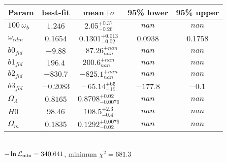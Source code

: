 \begin{tabular}{|l|c|c|c|c|} 
 \hline 
Param & best-fit & mean$\pm\sigma$ & 95\% lower & 95\% upper \\ \hline 
$100~\omega_{b }$ &$1.246$ & $2.05_{-0.26}^{+0.37}$ & $nan$ & $nan$ \\ 
$\omega_{cdm }$ &$0.1654$ & $0.1301_{-0.02}^{+0.013}$ & $0.0938$ & $0.1758$ \\ 
$b0_{fld }$ &$-9.88$ & $-87.26_{nan}^{+nan}$ & $nan$ & $nan$ \\ 
$b1_{fld }$ &$196.4$ & $200.6_{nan}^{+nan}$ & $nan$ & $nan$ \\ 
$b2_{fld }$ &$-830.7$ & $-825.1_{nan}^{+nan}$ & $nan$ & $nan$ \\ 
$b3_{fld }$ &$-0.2083$ & $-65.14_{-15}^{+65}$ & $-177.8$ & $-0.1$ \\ 
$\Omega_{\Lambda }$ &$0.8165$ & $0.8708_{-0.0079}^{+0.02}$ & $nan$ & $nan$ \\ 
$H0$ &$98.46$ & $108.5_{-0.4}^{+2.3}$ & $nan$ & $nan$ \\ 
$\Omega_{m }$ &$0.1835$ & $0.1292_{-0.02}^{+0.0079}$ & $nan$ & $nan$ \\ 
\hline 
 \end{tabular} \\ 
$-\ln{\cal L}_\mathrm{min} =340.641$, minimum $\chi^2=681.3$ \\ 
